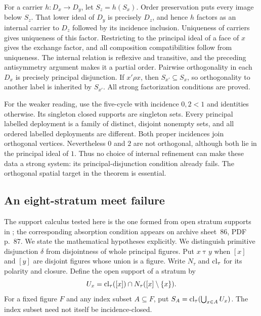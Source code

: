 For a carrier $h:D_x\to D_y$, let $S_z=h(S_x)$. Order preservation
puts every image below $S_z$. That lower ideal of $D_y$ is precisely
$D_z$, and hence $h$ factors as an internal carrier to $D_z$ followed
by its incidence inclusion. Uniqueness of carriers gives uniqueness
of this factor. Restricting to the principal ideal of a face of
$x$ gives the exchange factor, and all composition compatibilities
follow from uniqueness. The internal relation is reflexive and
transitive, and the preceding antisymmetry argument makes it a
partial order. Pairwise orthogonality in each $D_x$ is precisely
principal disjunction. If $x'\rho x$, then $S_{x'}\subseteq S_x$,
so orthogonality to another label is inherited by $S_{x'}$.
All strong factorization conditions are proved.

For the weaker reading, use the five-cycle with incidence
$0,2<1$ and identities otherwise. Its singleton closed supports
are singleton sets. Every principal labelled deployment is a
family of distinct, disjoint nonempty sets, and all ordered
labelled deployments are different. Both proper incidences
join orthogonal vertices. Nevertheless $0$ and $2$ are not
orthogonal, although both lie in the principal ideal of $1$.
Thus no choice of internal refinement can make these data a
strong system: its principal-disjunction condition already fails.
The orthogonal spatial target in the theorem is essential.

\subsection{An eight-stratum meet failure}
The support calculus tested here is the one formed from open
stratum supports in \cite[archive sheets~92--93, PDF pp.~93--94]{Groth7};
the corresponding absorption condition appears on archive
sheet~86, PDF p.~87. We state the mathematical hypotheses explicitly.
We distinguish primitive disjunction $\delta$ from disjointness
of whole principal figures. Put $x\mathrel{\tau}y$ when $[x]$
and $[y]$ are disjoint figures whose union is a figure. Write
$N_\tau$ and $\operatorname{cl}_\tau$ for its polarity and closure. Define the
open support of a stratum by
\[
 U_x=\operatorname{cl}_\tau([x])\cap N_\tau([x]\setminus\{x\}).
\]
For a fixed figure $F$ and any index subset $A\subseteq F$, put
$S_A=\operatorname{cl}_\tau(\bigcup_{x\in A}U_x)$. The index subset need not
itself be incidence-closed.

